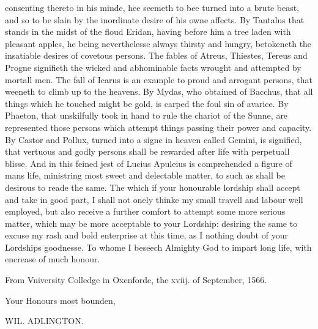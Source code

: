 consenting thereto in his minde, hee seemeth to bee turned into a brute beast,
and so to be slain by the inordinate desire of his owne affects. By Tantalus
that stands in the midst of the floud Eridan, having before him a tree laden
with pleasant apples, he being neverthelesse always thirsty and hungry,
betokeneth the insatiable desires of covetous persons. The fables of Atreus,
Thiestes, Tereus and Progne signifieth the wicked and abhominable facts wrought
and attempted by mortall men. The fall of Icarus is an example to proud and
arrogant persons, that weeneth to climb up to the heavens. By Mydas, who
obtained of Bacchus, that all things which he touched might be gold, is carped
the foul sin of avarice. By Phaeton, that unskilfully took in hand to rule the
chariot of the Sunne, are represented those persons which attempt things
passing their power and capacity. By Castor and Pollux, turned into a signe in
heaven called Gemini, is signified, that vertuous and godly persons shall be
rewarded after life with perpetuall blisse. And in this feined jest of Lucius
Apuleius is comprehended a figure of mans life, ministring most sweet and
delectable matter, to such as shall be desirous to reade the same. The which if
your honourable lordship shall accept and take in good part, I shall not onely
thinke my small travell and labour well employed, but also receive a further
comfort to attempt some more serious matter, which may be more acceptable to
your Lordship: desiring the same to excuse my rash and bold enterprise at this
time, as I nothing doubt of your Lordships goodnesse. To whome I beseech
Almighty God to impart long life, with encrease of much honour.

From Vniversity Colledge in Oxenforde, the xviij. of September, 1566.

Your Honours most bounden,

WIL. ADLINGTON.


